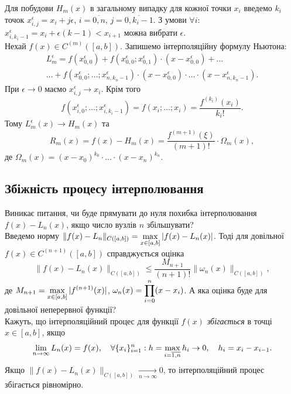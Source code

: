 Для побудови $H_m(x)$ в загальному випадку для кожної точки $x_i$ введемо $k_i$ точок $x_{i,j}^\epsilon = x_i + j\epsilon$, $i=\overline{0,n}$, $j=\overline{0,k_i-1}$. З умови $\forall i$: $x_{i,k_i-1}^\epsilon = x_i + \epsilon(k-1) < x_{i+1}$ можна вибрати $\epsilon$. \\

Нехай $f(x) \in C^{(m)}([a,b])$. Запишемо інтерполяційну формулу Ньютона:
\begin{multline*} 
    L_m^\epsilon = f\left(x_{0,0}^\epsilon\right)+f\left(x_{0,0}^\epsilon;x_{0,1}^\epsilon\right)\cdot\left(x-x_{0,0}^\epsilon\right) + \ldots \\

    \ldots + f\left(x_{0,0}^\epsilon;\ldots;x_{n,k_n-1}^\epsilon\right)\cdot\left(x-x_{0,0}^\epsilon\right)\cdot\ldots\cdot\left(x-x_{n,k_n-1}^\epsilon\right).
\end{multline*}
При $\epsilon \to 0$ маємо $x_{i,j}^\epsilon \to x_i$. Крім того
\[f\left(x_{i,0}^\epsilon;\ldots;x_{i,k_i-1}^\epsilon\right)=f(x_i;\ldots;x_i)=\dfrac{f^{(k_i)}(x_i)}{k_i!}.\]
Тому $L_m^\epsilon(x)\to H_m(x)$ та
\[ R_m(x) = f(x) - H_m(x) = \dfrac{f^{(m+1)}(\xi)}{(m+1)!}\cdot \Omega_m(x),\]
де $\Omega_m(x) = (x-x_0)^{k_0}\cdot\ldots\cdot(x-x_n)^{k_n}$.
\subsection{Збіжність процесу інтерполювання}
Виникає питання, чи буде прямувати до нуля похибка інтерполювання $f(x) - L_n(x)$, якщо число вузлів $n$ збільшувати? \\

Введемо норму $\|f(x)-L_n\|_{C([a,b])} = \displaystyle\max\limits_{x\in[a,b]}|f(x)-L_n(x)|$. Тоді для довільної $f(x)\in C^{(n+1)}([a,b])$ справджується оцінка
\begin{equation}
    \label{eq:6.20}
    \| f(x) - L_n(x)\|_{C([a,b])} \le \dfrac{M_{n+1}}{(n+1)!}\|\omega_n(x)\|_{C([a,b])},
\end{equation}
де $M_{n+1} = \displaystyle\max\limits_{x\in[a,b]} |f^{(n+1)}(x)|$, $\omega_n(x) = \displaystyle\prod\limits_{i=0}^n (x-x_i)$. А яка оцінка буде для довільної неперервної функції? \\

Кажуть, що інтерполяційний процес для функції $f(x)$ \textit{збігається} в точці $x\in[a,b]$, якщо 
\[ \displaystyle\lim\limits_{n\to\infty} L_n(x) = f(x), \quad \forall \{x_i\}_{i=1}^n: h = \displaystyle\max\limits_{i=\overline{1,n}} h_i \to 0, \quad h_i = x_i - x_{i-1}.\]
Якщо $\|f(x)-L_n(x)\|_{C([a,b])} \xrightarrow[n\to\infty]{}0$, то інтерполяційний процес збігається рівномірно. \\

